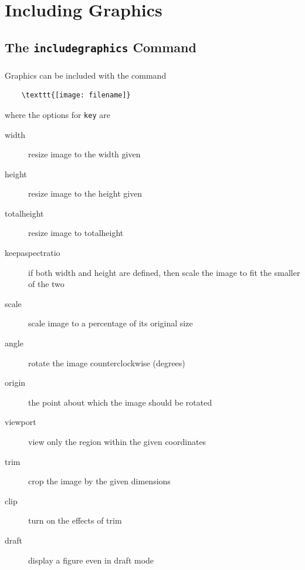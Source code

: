 \documentclass[article]{beamer}
\begin{document}
\section{Including Graphics}
\subsection{The \texttt{includegraphics} Command}
\begin{frame}
  \frametitle{\thesubsection}
  \framesubtitle{}
  Graphics can be included with the command
  \begin{verbatim}
    \texttt{[image: filename]}
  \end{verbatim} \vspace{-16pt}
  where the options for \texttt{key} are
  \begin{description}%
    \item[width] resize  image to the width  given
    \item[height] resize image to the height given
    \item[totalheight] resize image to totalheight
    \item[keepaspectratio] if both width and height are defined, then scale the image to fit the smaller of the two
    \item[scale] scale image to a percentage of its original size
    \item[angle] rotate the image counterclockwise (degrees)
    \item[origin] the point about which the image should be rotated
    \item[viewport] view only the region within the given coordinates
    \item[trim] crop the image by the given dimensions 
    \item[clip] turn on the effects of trim
    \item[draft] display a figure even in draft mode
  \end{description}
\end{frame}
\end{document}
